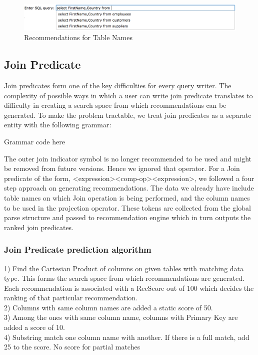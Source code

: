 \documentclass{acm_proc_article-sp}
\begin{document}
\begin{figure}
\centering
\includegraphics[width=170mm]{table_names.png}
\caption{Recommendations for Table Names}
\label{overflow}
\end{figure}



\subsection{Join Predicate}
Join predicates form one of the key difficulties for every query writer. The complexity of possible ways in which a user can write join predicate translates to difficulty in creating a search space from which recommendations can be generated. To make the problem tractable, we treat join predicates as a separate entity with the following grammar:

Grammar code here


The outer join indicator symbol is no longer recommended to be used and might be removed from future versions. Hence we ignored that operator. For a Join predicate of the form,  \textless expression\textgreater  \textless comp-op\textgreater \textless expression\textgreater, we followed a four step approach on generating recommendations. The data we already have include table names on which Join operation is being performed, and the column names to be used in the projection operator. These tokens are collected from the global parse structure  and passed to recommendation engine which in turn outputs the ranked join predicates. 

\subsubsection{Join Predicate prediction algorithm}
1) Find the Cartesian Product of columns on given tables with matching data type. This forms the search space from which recommendations are generated. Each recommendation is associated with a RecScore out of 100 which decides the ranking of that particular recommendation. 
\\ 2) Columns with same column names are added a static score of 50.
\\ 3) Among the ones with same column name, columns with Primary Key  are added a score of 10.
\\ 4) Substring match one column name with another. If there is a full match, add 25 to the score. No score for partial matches 
\end{document}
